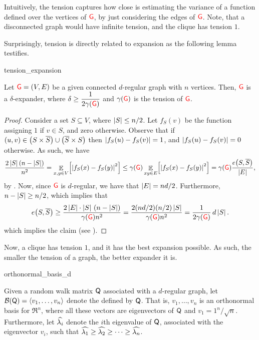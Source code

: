 Intuitively, the tension captures how close is estimating the variance
of a function defined over the vertices of ${\textcolor{red}{\mathsf{G}}}$, by just
considering the edges of ${\textcolor{red}{\mathsf{G}}}$. Note, that a disconnected graph
would have infinite tension, and the clique has tension $1$.

Surprisingly, tension is directly related to expansion as the
following lemma testifies.

\begin{fragment}{tension_expansion}
\begin{lemma}
    Let ${\textcolor{red}{\mathsf{G}}}=(V,E)$ be a given connected $d$-regular graph with $n$
    vertices. Then, ${\textcolor{red}{\mathsf{G}}}$ is a $\delta$-expander, where
    $\displaystyle \delta \geq \frac{1}{2 \DialX{\Graph}}$ and 
    $\DialX{\Graph}$ is the tension of ${\textcolor{red}{\mathsf{G}}}$.

\end{lemma}
\end{fragment}

\begin{proof}
    Consider a set $S \subseteq V$, where $\left| {S} \right| \leq n/2$. Let
    $f_S(v)$ be the function assigning $1$ if $v \in S$, and zero
    otherwise. Observe that if $(u,v) \in \pth{S \times \overline{S} }
    \cup \pth{ \overline{S} \times S}$ then $\left| {f_S(u)-f_S(v)} \right| =
    1$, and $\left| {f_S(u)-f_S(v)} \right|=0$ otherwise. As such, we have
    \[
    \frac{2 \cardin{S}\pth{n-\cardin{S}}}{n^2} = \ExExt{x,y \in
       V}{\cardin{f_S(x)- f_S(y)}^2} \leq \DialX{\Graph} \ExExt{ xy
       \in E}{\cardin{f_S(x)- f_S(y)}^2} = \DialX{\Graph}
    \frac{e\pth{S, \overline{S}}}{\cardin{E}},
    \]
    by . Now, since ${\textcolor{red}{\mathsf{G}}}$ is $d$-regular, we have
    that $\left| {E} \right| = nd/2$. Furthermore, $n- \left| {S} \right| \geq n/2$,
    which implies that
    \[
    e\pth{S, \overline{S}}%
    \geq%
    \frac{2\cardin{E}\cdot
       \cardin{S}\,\pth{n-\cardin{S}}}{\DialX{\Graph}n^2} = \frac{2(n
       d/2)(n/2) \cardin{S}}{ \DialX{\Graph} n^2} = \frac{1}{2
       \DialX{\Graph}} \, d\cardin{S}.
    \]
    which implies the claim (see ).
\end{proof}

\bigskip

Now, a clique has tension $1$, and it has the best expansion
possible. As such, the smaller the tension of a graph, the better
expander it is.


\begin{fragment}{orthonormal_basis_d}
\begin{defn}
    Given a random walk matrix $\mathsf{Q}$ associated with a $d$-regular
    graph, let $\mathcal{B}(\mathsf{Q})= \left\langle {v_1,\ldots, v_n} \right\rangle$ denote the
     defined by $\mathsf{Q}$. That
    is, $v_1,\ldots, v_n$ is an orthonormal basis for $\Re^n$, where
    all these vectors are eigenvectors of $\mathsf{Q}$ and $v_1=
    1^n/\sqrt{n}$. Furthermore, let $\widehat{\lambda_{i}}$ denote the $i$th
    eigenvalue of $\mathsf{Q}$, associated with the eigenvector $v_i$,
    such that $\widehat{\lambda_{1}} \geq \widehat{\lambda_{2}} \geq \cdots \geq \widehat{\lambda_{n}}$.

\end{defn}
\end{fragment}

